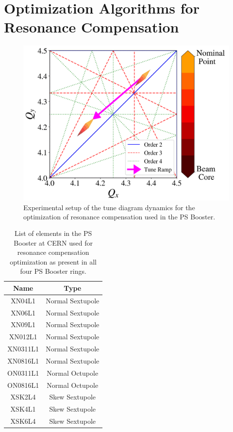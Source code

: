 \section{Optimization Algorithms for Resonance Compensation}

\cite{geoff}

\begin{figure}[H]
    \centering
    \includegraphics[width=\linewidth]{chapter5/experiment.png}
    \caption{Experimental setup of the tune diagram dynamics for the optimization of resonance compensation used in the PS Booster.}
    \label{fig:experimentPSB}
\end{figure}

\begin{table}[H]
    \centering
    \caption{List of elements in the PS Booster at CERN used for resonance compensation optimization as present in all four PS Booster rings.}
    \label{tab:psbcomp}
    \begin{tabular}{|c|c|}
    \hline
    \textbf{Name} & \textbf{Type}    \\ \hline
    XN04L1    & Normal Sextupole \\ \hline
    XN06L1    & Normal Sextupole \\ \hline
    XN09L1    & Normal Sextupole \\ \hline
    XN012L1    & Normal Sextupole \\ \hline
    XN0311L1    & Normal Sextupole   \\ \hline
    XN0816L1    & Normal Sextupole   \\ \hline
    ON0311L1    & Normal Octupole  \\ \hline
    ON0816L1    & Normal Octupole   \\ \hline
    XSK2L4    & Skew Sextupole  \\ \hline
    XSK4L1    & Skew Sextupole   \\ \hline
    XSK6L4    & Skew Sextupole   \\ \hline
    \end{tabular}
\end{table}

